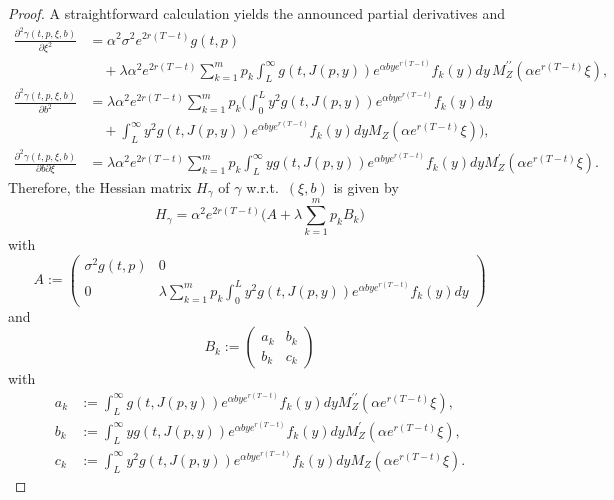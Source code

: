 \documentclass[10pt,a4paper]{amsart}
\begin{document}
\begin{proof}
   A straightforward calculation yields the announced partial derivatives and
	\begin{align*}
   \frac{\partial^2\gamma(t,p,\xi,b)}{\partial \xi^2} &= \alpha^2\sigma^2e^{2r(T-t)}g(t,p) \\
   &\quad + \lambda\alpha^2e^{2r(T-t)}\sum_{k=1}^m p_k\int_L^\infty\! g(t,J(p,y))e^{\alpha b y e^{r(T-t)}}f_k(y)dy\,M_Z^{\prime\prime}(\alpha e^{r(T-t)}\xi),\\
\frac{\partial^2\gamma(t,p,\xi,b)}{\partial b^2} &= \lambda\alpha^2e^{2r(T-t)}\sum_{k=1}^m p_k\bigg(\int_0^L y^2g(t,J(p,y))e^{\alpha b y e^{r(T-t)}}f_k(y)dy\\
&\quad +\int_L^\infty y^2g(t,J(p,y))e^{\alpha b y e^{r(T-t)}}f_k(y)dy M_Z(\alpha e^{r(T-t)}\xi)\bigg), \\
\frac{\partial^2\gamma(t,p,\xi,b)}{\partial b\partial\xi} &= \lambda\alpha^2e^{2r(T-t)}\sum_{k=1}^m p_k\int_L^\infty yg(t,J(p,y))e^{\alpha b y e^{r(T-t)}}f_k(y)dy M_Z^\prime(\alpha e^{r(T-t)}\xi).
\end{align*}
Therefore, the Hessian matrix $H_\gamma$ of $\gamma$ w.r.t.\ $(\xi,b)$ is given by
\begin{equation*}
H_\gamma=\alpha^2e^{2r(T-t)}\Big(A+\lambda\sum_{k=1}^m p_k B_k\Big)
\end{equation*}
with
\begingroup
\renewcommand*{\arraystretch}{1.4}
\begin{equation*}
A:=\begin{pmatrix}
\sigma^2g(t,p) & 0 \\
0 & \lambda\sum_{k=1}^m p_k\int_0^L y^2g(t,J(p,y))e^{\alpha b y e^{r(T-t)}}f_k(y)dy
\end{pmatrix}
\end{equation*}
and
\begin{equation*}
B_k:=\begin{pmatrix}
a_k &  b_k \\
b_k & c_k
\end{pmatrix}
\end{equation*}
\endgroup
with
\begin{align*}
a_k &:= \int_L^\infty g(t,J(p,y))e^{\alpha b y e^{r(T-t)}}f_k(y)dy M_Z^{\prime\prime}(\alpha e^{r(T-t)}\xi),\\
b_k &:= \int_L^\infty yg(t,J(p,y))e^{\alpha b y e^{r(T-t)}}f_k(y)dy M_Z^\prime(\alpha e^{r(T-t)}\xi),\\
c_k &:= \int_L^\infty y^2g(t,J(p,y))e^{\alpha b y e^{r(T-t)}}f_k(y)dy M_Z(\alpha e^{r(T-t)}\xi).
\end{align*}

\end{proof}
\end{document}
